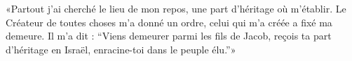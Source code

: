 «Partout j’ai cherché le lieu de mon repos,
    une part d’héritage où m’établir.
Le Créateur de toutes choses m’a donné un ordre,
    celui qui m’a créée a fixé ma demeure.
Il m’a dit : “Viens demeurer parmi les fils de Jacob,
    reçois ta part d’héritage en Israël, enracine-toi dans le peuple élu.”»